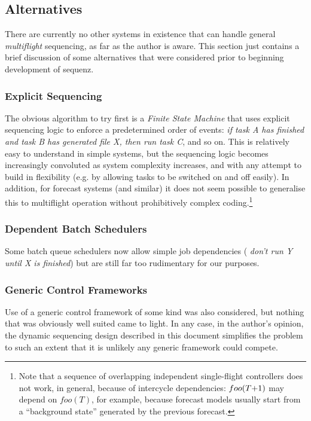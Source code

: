 \documentclass[11pt,a4paper]{article}
\begin{document}
\subsection{Alternatives}

There are currently no other systems in existence that can handle
general {\em multiflight} sequencing, as far as the author is aware.
This section just contains a brief discussion of some alternatives that
were considered prior to beginning development of sequenz.

\subsubsection{Explicit Sequencing}

The obvious algorithm to try first is a {\em Finite State Machine} that
uses explicit sequencing logic to enforce a predetermined order of
events: {\em if task A has finished and task B has generated file X,
then run task C}, and so on. This is relatively easy to understand in
simple systems, but the sequencing logic becomes increasingly convoluted
as system complexity increases, and with any attempt to build in
flexibility (e.g. by allowing tasks to be switched on and off easily).
In addition, for forecast systems (and similar) it does not seem
possible to generalise this to multiflight operation without
prohibitively complex coding.\footnote{Note that a sequence of
overlapping independent single-flight controllers does not work, in
general, because of intercycle dependencies: $foo(T\negmedspace
+\negmedspace 1)$ may depend on $foo(T)$, for example, because forecast
models usually start from a ``background state'' generated by the
previous forecast.} 


\subsubsection{Dependent Batch Schedulers}

Some batch queue schedulers now allow simple job dependencies ({\em
don't run Y until X is finished}) but are still far too rudimentary for
our purposes. 


\subsubsection{Generic Control Frameworks}

Use of a generic control framework of some kind was also
considered, but nothing that was obviously well suited came to light. In
any case, in the author's opinion, the dynamic sequencing design
described in this document simplifies the problem to such an extent that
it is unlikely any generic framework could compete.  
\end{document}
